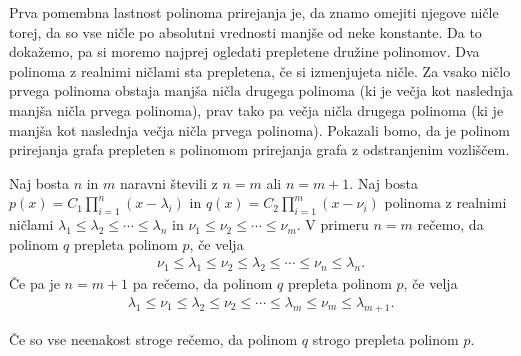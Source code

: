 Prva pomembna lastnost polinoma prirejanja je, da znamo omejiti njegove ničle torej, da so vse ničle po absolutni vrednosti manjše od neke konstante. Da to dokažemo, pa si moremo najprej ogledati prepletene družine polinomov. Dva polinoma z realnimi ničlami sta prepletena, če si izmenjujeta ničle. Za vsako ničlo prvega polinoma obstaja manjša ničla drugega polinoma (ki je večja kot naslednja manjša ničla prvega polinoma), prav tako pa večja ničla drugega polinoma (ki je manjša kot naslednja večja ničla prvega polinoma). Pokazali bomo, da je polinom prirejanja grafa prepleten s polinomom prirejanja grafa z odstranjenim vozliščem.

\begin{definicija}
    Naj bosta \(n\) in \(m\) naravni števili z \(n=m\) ali \(n=m+1\). Naj bosta \(p(x) = C_1 \prod_{i=1}^n (x-\lambda_i)\) in \(q(x) = C_2 \prod_{i=1}^m (x-\nu_i)\) polinoma z realnimi ničlami \(\lambda_1 \leq \lambda_2 \leq \cdots \leq \lambda_n\) in \(\nu_1 \leq \nu_2 \leq \cdots \leq \nu_m\). V primeru \(n=m\) rečemo, da polinom \(q\) prepleta polinom \(p\), če velja
    \begin{align*}
        \nu_1 \leq \lambda_1 \leq \nu_2 \leq \lambda_2 \leq \cdots \leq \nu_n \leq \lambda_n.
    \end{align*}
    Če pa je \(n=m+1\) pa rečemo, da polinom \(q\) prepleta polinom \(p\), če velja
    \begin{align*}
        \lambda_1 \leq \nu_1 \leq \lambda_2 \leq \nu_2 \leq \cdots \leq \lambda_m \leq \nu_m \leq \lambda_{m+1}.
    \end{align*}

    Če so vse neenakost stroge rečemo, da polinom \(q\) strogo prepleta polinom \(p\).
\end{definicija}

